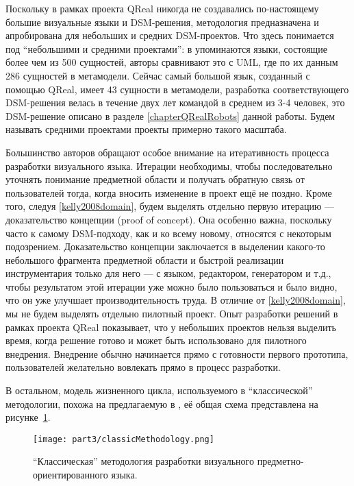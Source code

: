 Поскольку в рамках проекта QReal никогда не создавались по-настоящему большие визуальные 
языки и DSM-решения, методология предназначена и апробирована для небольших и средних DSM-проектов. 
Что здесь понимается под "`небольшими и средними проектами"': в \cite{luoma2004defining} 
упоминаются языки, состоящие более чем из 500 сущностей, авторы сравнивают это с UML, 
где по их данным 286 сущностей в метамодели. Сейчас самый большой язык, созданный с 
помощью QReal, имеет 43 сущности в метамодели, разработка соответствующего DSM-решения 
велась в течение двух лет командой в среднем из 3-4 человек, это DSM-решение описано в 
разделе \ref{chapterQRealRobots} данной работы. Будем называть средними проектами 
проекты примерно такого масштаба.

Большинство авторов обращают особое внимание на итеративность процесса разработки 
визуального языка. Итерации необходимы, чтобы последовательно уточнять понимание предметной 
области и получать обратную связь от пользователей тогда, когда вносить изменение 
в проект ещё не поздно. Кроме того, следуя \ref{kelly2008domain}, будем выделять отдельно 
первую итерацию --- доказательство концепции (proof of concept). Она особенно важна, 
поскольку часто к самому DSM-подходу, как и ко всему новому, относятся с некоторым 
подозрением. Доказательство концепции заключается в выделении какого-то небольшого 
фрагмента предметной области и быстрой реализации инструментария только для него --- 
с языком, редактором, генератором и т.д., чтобы результатом этой итерации уже можно 
было пользоваться и было видно, что он уже улучшает производительность труда. В отличие 
от \ref{kelly2008domain}, мы не будем выделять отдельно пилотный проект. Опыт разработки 
решений в рамках проекта QReal показывает, что у небольших проектов нельзя выделить 
время, когда решение готово и может быть использовано для пилотного внедрения. Внедрение 
обычно начинается прямо с готовности первого прототипа, пользователей желательно вовлекать 
прямо в процесс разработки.

В остальном, модель жизненного цикла, используемого в "`классической"' методологии, 
похожа на предлагаемую в \cite{koznov2008development}, её общая схема представлена на 
рисунке~\ref{classicMethodology}.

\begin{figure} [ht]
	\begin{center}
		\texttt{[image: part3/classicMethodology.png]}
		\caption{"`Классическая"' методология разработки визуального предметно-ориентированного языка.}
		\label{classicMethodology}
	\end{center}
\end{figure}

